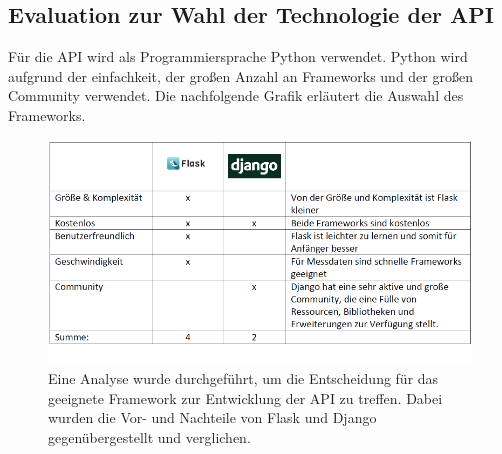 \documentclass[
]{article}
\begin{document}
\subsection{Evaluation zur Wahl der Technologie der API}
Für die API wird als Programmiersprache Python verwendet. Python wird aufgrund der einfachkeit, der großen Anzahl an Frameworks und der großen Community verwendet. Die nachfolgende Grafik erläutert die Auswahl des Frameworks.
\begin{figure}[H]
    \centering
    \includegraphics[width=1\textwidth]{./resources/ArchitekturAPI.png}
    \caption{Eine Analyse wurde durchgeführt, um die Entscheidung für das geeignete Framework zur Entwicklung der API zu treffen. Dabei wurden die Vor- und Nachteile von Flask und Django gegenübergestellt und verglichen.}
    \label{fig:deine_label}
\end{figure}
\end{document}
